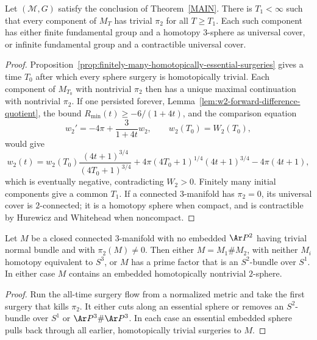\begin{proposition}
\label{prop:eventual-trivial-pi2}
\label{pi2}
Let $({\mathcal M},G)$ satisfy the conclusion of Theorem~\ref{MAIN}. There is
$T_1<\infty$ such that every component of $M_T$ has trivial $\pi_2$ for all
$T\ge T_1$. Each such component has either finite fundamental group and a
homotopy $3$-sphere as universal cover, or infinite fundamental group and a
contractible universal cover.
\end{proposition}
\begin{proof}
\sketch Proposition~\ref{prop:finitely-many-homotopically-essential-surgeries}
gives a time $T_0$ after which every sphere surgery is homotopically trivial.
Each component of $M_{T_0}$ with nontrivial $\pi_2$ then has a unique maximal
continuation with nontrivial $\pi_2$. If one persisted forever,
Lemma~\ref{lem:w2-forward-difference-quotient}, the bound
$R_{\min}(t)\ge-6/(1+4t)$, and the comparison equation
\[
w_2'=-4\pi+\frac{3}{1+4t}w_2,
\qquad w_2(T_0)=W_2(T_0),
\]
would give
\[
w_2(t)=w_2(T_0)\frac{(4t+1)^{3/4}}{(4T_0+1)^{3/4}}
+4\pi(4T_0+1)^{1/4}(4t+1)^{3/4}-4\pi(4t+1),
\]
which is eventually negative, contradicting $W_2>0$. Finitely many initial
components give a common $T_1$. If a connected $3$-manifold has $\pi_2=0$,
its universal cover is $2$-connected; it is a homotopy sphere when compact,
and is contractible by Hurewicz and Whitehead when noncompact.
\end{proof}

\begin{corollary}
\label{cor:sphere-theorem-no-rp2}
\label{spherethm}
Let $M$ be a closed connected $3$-manifold with no embedded $\Ar P^2$ having
trivial normal bundle and with $\pi_2(M)\ne0$. Then either
$M=M_1\#M_2$, with neither $M_i$ homotopy equivalent to $S^3$, or $M$ has a
prime factor that is an $S^2$-bundle over $S^1$. In either case $M$ contains
an embedded homotopically nontrivial $2$-sphere.
\end{corollary}
\begin{proof}
\sketch Run the all-time surgery flow from a normalized metric and take the first
surgery that kills $\pi_2$. It either cuts along an essential sphere or removes
an $S^2$-bundle over $S^1$ or $\Ar P^3\#\Ar P^3$. In each case an essential
embedded sphere pulls back through all earlier, homotopically trivial surgeries
to $M$.
\end{proof}

